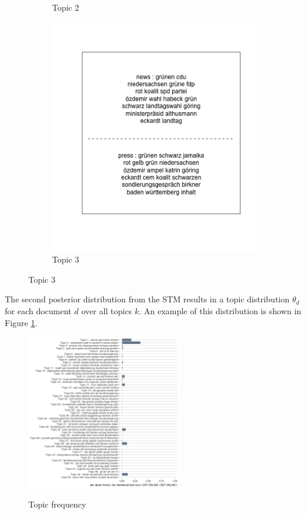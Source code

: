 \documentclass[12pt,a4paper,notitlepage]{article}
\begin{document}
\begin{figure}[H]
\begin{center}
\begin{subfigure}[normla]{0.3\textwidth}
			\caption{Topic 2}
		\end{subfigure}
		\begin{subfigure}[normla]{0.3\textwidth}
			\includegraphics[width=\textwidth]{../figs/topiclabel/topic_label3}
			\caption{Topic 3}
		\end{subfigure}
	\end{center}
\end{figure}

The second posterior distribution from the STM results in a topic distribution $\theta_d$ for each document $d$ over all topics $k$.  An example of this distribution is shown in Figure \ref{fig_doc_topic_distr}.

\begin{figure}[H]
\begin{center}
	\caption{Topic frequency}
	\includegraphics[width=0.6\textwidth]{../figs/doc_topic_distr}
	\label{fig_doc_topic_distr}
	\end{center}
\end{figure}
\end{document}
